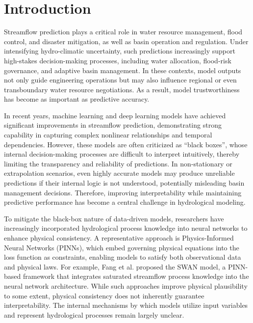 \section{Introduction}

Streamflow prediction plays a critical role in water resource management, flood control, and disaster mitigation, as well as basin operation and regulation\cite{GAO2026103148}. Under intensifying hydro-climatic uncertainty\cite{immerzeel2010climate}, such predictions increasingly support high-stakes decision-making processes, including water allocation, flood-risk governance, and adaptive basin management\cite{milly2020colorado}. In these contexts, model outputs not only guide engineering operations but may also influence regional or even transboundary water resource negotiations. As a result, model trustworthiness has become as important as predictive accuracy.

In recent years, machine learning and deep learning models have achieved significant improvements in streamflow prediction, demonstrating strong capability in capturing complex nonlinear relationships and temporal dependencies\cite{apak2026multi,ZIPPER2026134909}. However, these models are often criticized as ``black boxes''\cite{Núñez2023_XAI}, whose internal decision-making processes are difficult to interpret intuitively, thereby limiting the transparency and reliability of predictions\cite{WangShap2024}. In non-stationary or extrapolation scenarios, even highly accurate models may produce unreliable predictions if their internal logic is not understood, potentially misleading basin management decisions. Therefore, improving interpretability while maintaining predictive performance has become a central challenge in hydrological modeling\cite{MardShap2022}.

To mitigate the black-box nature of data-driven models, researchers have increasingly incorporated hydrological process knowledge into neural networks to enhance physical consistency\cite{SCHMID2026124819}. A representative approach is Physics-Informed Neural Networks (PINNs), which embed governing physical equations into the loss function as constraints, enabling models to satisfy both observational data and physical laws\cite{SHI2025_PINN,LIU2026_PINN}. For example, Fang et al.\cite{FANG2025_PINN} proposed the SWAN model, a PINN-based framework that integrates saturated streamflow process knowledge into the neural network architecture. While such approaches improve physical plausibility to some extent, physical consistency does not inherently guarantee interpretability\cite{Roscher2020_Explainable}. The internal mechanisms by which models utilize input variables\cite{NASER2026_Inrter} and represent hydrological processes remain largely unclear\cite{Krishnapriyan2021_PINN}.

